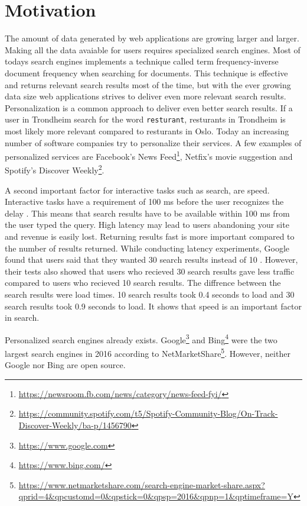 \section{Motivation}
The amount of data generated by web applications are growing larger and larger.
Making all the data avaiable for users requires specialized search engines.
Most of todays search engines implements a technique called term frequency-inverse document frequency when searching for documents.
This technique is effective and returns relevant search results most of the time,
but with the ever growing data size web applications strives to deliver even more relevant search results.
Personalization is a common approach to deliver even better search results.
If a user in Trondheim search for the word \texttt{resturant},
resturants in Trondheim is most likely more relevant compared to resturants in Oslo.
Today an increasing number of software companies try to personalize their services.
A few examples of personalized services are Facebook's News Feed\footnote{\url{https://newsroom.fb.com/news/category/news-feed-fyi/}},
Netfix's movie suggestion \cite{netflix-recommendation} and Spotify's Discover Weekly\footnote{\url{https://community.spotify.com/t5/Spotify-Community-Blog/On-Track-Discover-Weekly/ba-p/1456790}}.

A second important factor for interactive tasks such as search, are speed.
Interactive tasks have a requirement of 100 ms before the user recognizes the delay \cite{google-latency}.
This means that search results have to be available within 100 ms from the user typed the query.
High latency may lead to users abandoning your site and revenue is easily lost.
Returning results fast is more important compared to the number of results returned.
While conducting latency experiments, Google found that users said that they wanted 30 search results instead of 10 \cite{google-marissa}.
However,
their tests also showed that users who recieved 30 search results gave less traffic compared to users who recieved 10 search results.
The diffrence between the search results were load times.
10 search results took 0.4 seconds to load and 30 search results took 0.9 seconds to load.
It shows that speed is an important factor in search.

Personalized search engines already exists.
Google\footnote{\url{https://www.google.com}} and Bing\footnote{\url{https://www.bing.com/}}
were the two largest search engines in 2016 according to NetMarketShare\footnote{\url{https://www.netmarketshare.com/search-engine-market-share.aspx?qprid=4&qpcustomd=0&qpstick=0&qpsp=2016&qpnp=1&qptimeframe=Y}}.
However, neither Google nor Bing are open source.

